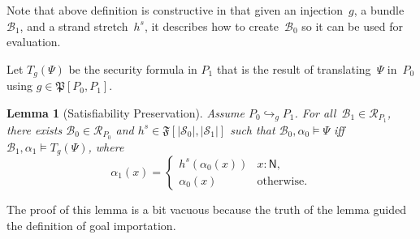 \documentclass[12pt]{article}
\newtheorem{lem}{Lemma}
\newcommand{\srt}[1]{\ensuremath{\mathsf{#1}}}
\newcommand{\typ}{\mathbin:}
\newcommand{\alg}[1]{\ensuremath{\mathfrak{#1}}}
\newcommand{\ssp}{\ensuremath{\mathcal{S}}}
\newcommand{\bun}{\ensuremath{\mathcal{B}}}
\newcommand{\run}{\mathcal{R}}
\begin{document}
Note that above definition is constructive in that given an
injection~$g$, a bundle~$\bun_1$, and a strand stretch~$h^s$, it
describes how to create~$\bun_0$ so it can be used for evaluation.

Let $T_g(\Psi)$ be the security formula in $P_1$ that is the result of
translating~$\Psi$ in~$P_0$ using $g\in\alg{P}[P_0,P_1]$.

\begin{lem}[Satisfiability Preservation]
\label{lem:satisfiability preservation}
Assume $P_0\hookrightarrow_g P_1$.  For all~$\bun_1\in\run_{P_1}$,
there exists $\bun_0\in\run_{P_0}$ and $h^s\in\alg{F}[|\ssp_0|,
  |\ssp_1|]$ such that $\bun_0,\alpha_0\models\Psi$ iff
$\bun_1,\alpha_1\models T_g(\Psi)$, where
\[\alpha_1(x)=\left\{
\begin{array}{ll}
h^s(\alpha_0(x))&x\typ\srt{N},\\
\alpha_0(x)&\mbox{otherwise.}
\end{array}\right.\]

\end{lem}

The proof of this lemma is a bit vacuous because the truth of the
lemma guided the definition of goal importation.
\end{document}
